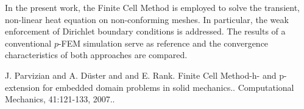 In the present work, the Finite Cell Method is employed to solve the
transient, non-linear heat equation on non-conforming meshes.
In particular, the weak enforcement of Dirichlet boundary conditions is
addressed.
The results of a conventional $p$-FEM simulation serve as reference and the
convergence characteristics of both approaches are compared.


\begin{thebibliography}{10}

{\sc J. Parvizian and A. D\"uster and and E. Rank}. {Finite Cell Method-h- and p-extension for embedded domain problems in solid mechanics.}. Computational Mechanics, 41:121-133, 2007..

\end{thebibliography}

